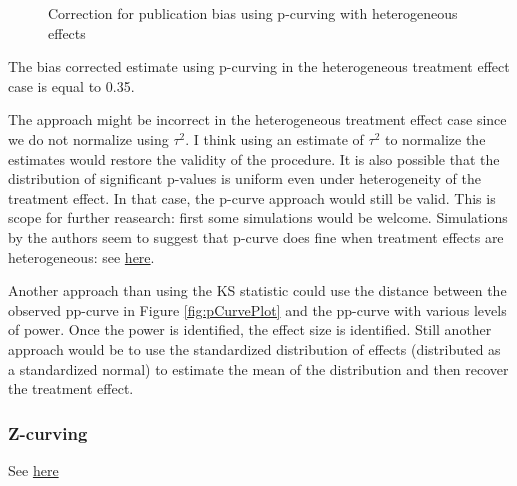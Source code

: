 \documentclass[]{book}
\theoremstyle{definition}
\theoremstyle{definition}
\theoremstyle{definition}
\theoremstyle{remark}
\let\BeginKnitrBlock\begin \let\EndKnitrBlock\end
\begin{document}
\begin{figure}[htbp]

{\centering {}

}

\caption{Correction for publication bias using p-curving with heterogeneous effects}\label{fig:pCurvePubBiasREPlot}
\end{figure}

The bias corrected estimate using p-curving in the heterogeneous treatment effect case is equal to 0.35.

\BeginKnitrBlock{remark}
\iffalse{} {Remark. } \fi{}The approach might be incorrect in the heterogeneous treatment effect case since we do not normalize using \(\tau^2\).
I think using an estimate of \(\tau^2\) to normalize the estimates would restore the validity of the procedure.
It is also possible that the distribution of significant p-values is uniform even under heterogeneity of the treatment effect.
In that case, the p-curve approach would still be valid.
This is scope for further reasearch: first some simulations would be welcome.
Simulations by the authors seem to suggest that p-curve does fine when treatment effects are heterogeneous: see \href{http://datacolada.org/67}{here}.
\EndKnitrBlock{remark}

\BeginKnitrBlock{remark}
\iffalse{} {Remark. } \fi{}Another approach than using the KS statistic could use the distance between the observed pp-curve in Figure \ref{fig:pCurvePlot} and the pp-curve with various levels of power.
Once the power is identified, the effect size is identified.
Still another approach would be to use the standardized distribution of effects (distributed as a standardized normal) to estimate the mean of the distribution and then recover the treatment effect.
\EndKnitrBlock{remark}

\hypertarget{z-curving}{%
\subsubsection{Z-curving}\label{z-curving}}

See \href{https://replicationindex.files.wordpress.com/2018/10/final-revision-874-manuscript-in-pdf-2236-1-4-20180425-mva-final-002.pdf}{here}
\end{document}
